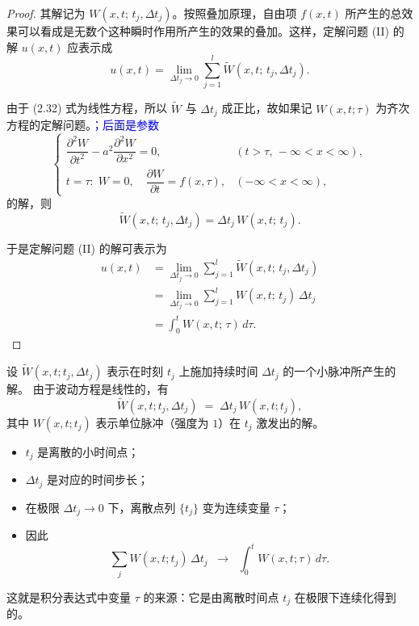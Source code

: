 \begin{proof}
    其解记为 $W(x,t;\,t_j,\Delta t_j)$。按照叠加原理，自由项 $f(x,t)$ 所产生的总效果可以看成是无数个这种瞬时作用所产生的效果的叠加。这样，定解问题 (II) 的解 $u(x,t)$ 应表示成
\begin{equation}
    u(x,t) = \lim_{\Delta t_j \to 0} \sum_{j=1}^l \widetilde{W}(x,t;\,t_j,\Delta t_j).
    \tag{2.33}
\end{equation}

由于 (2.32) 式为线性方程，所以 $\widetilde{W}$ 与 $\Delta t_j$ 成正比，故如果记 $W(x,t;\tau)$ 为齐次方程的定解问题。\textcolor{blue}{；后面是参数}
\begin{equation}
\begin{cases}
    \dfrac{\partial^2 W}{\partial t^2} - a^2 \dfrac{\partial^2 W}{\partial x^2} = 0, 
        & (t>\tau,\,-\infty < x < \infty), \\[1.2em]
    t=\tau:\; W=0,\quad \dfrac{\partial W}{\partial t} = f(x,\tau),
        & (-\infty < x < \infty),
\end{cases}
\tag{2.34}
\end{equation}
的解，则
\[
    \widetilde{W}(x,t;\,t_j,\Delta t_j) = \Delta t_j\, W(x,t;\,t_j).
\]

于是定解问题 (II) 的解可表示为
\begin{align*}
    u(x,t) &= \lim_{\Delta t_j \to 0} \sum_{j=1}^l \widetilde{W}(x,t;\,t_j,\Delta t_j) \\[0.5em]
           &= \lim_{\Delta t_j \to 0} \sum_{j=1}^l W(x,t;\,t_j)\,\Delta t_j \\[0.5em]
           &= \int_0^t W(x,t;\,\tau)\, d\tau.
\end{align*}
\end{proof}
\begin{proposition}
设 $\widetilde{W}(x,t;t_j,\Delta t_j)$ 表示在时刻 $t_j$ 上施加持续时间 $\Delta t_j$ 的一个小脉冲所产生的解。  
由于波动方程是线性的，有
\[
\widetilde{W}(x,t;t_j,\Delta t_j) \;=\; \Delta t_j \, W(x,t;t_j),
\]
其中 $W(x,t;t_j)$ 表示单位脉冲（强度为 $1$）在 $t_j$ 激发出的解。

\begin{itemize}
  \item $t_j$ 是离散的小时间点；
  \item $\Delta t_j$ 是对应的时间步长；
  \item 在极限 $\Delta t_j \to 0$ 下，离散点列 $\{t_j\}$ 变为连续变量 $\tau$；
  \item 因此
  \[
  \sum_j W(x,t;t_j)\,\Delta t_j \;\;\longrightarrow\;\; \int_0^t W(x,t;\tau)\,d\tau.
  \]
\end{itemize}

这就是积分表达式中变量 $\tau$ 的来源：它是由离散时间点 $t_j$ 在极限下连续化得到的。
\end{proposition}
